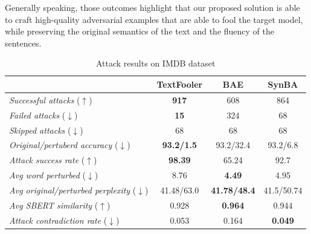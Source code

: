 Generally speaking, those outcomes highlight that our proposed solution is able to craft high-quality adversarial examples that are able to fool the target model, while preserving the original semantics of the text and the fluency of the sentences.

\begin{table}[h]
    \footnotesize
    \centering
    \begin{tabular}{|l|c|c|c|}
        \hline
        {} &           \textbf{TextFooler} &   \textbf{BAE} &    \textbf{SynBA} \\
        \hline \hline
        \emph{Successful attacks}  ($\uparrow$)             &      \textbf{917} &             608 &               864 \\
        \emph{Failed  attacks}  ($\downarrow$)                &       \textbf{15} &             324 &                68 \\
        \emph{Skipped  attacks}  ($\downarrow$)             &       68 &              68 &                68 \\
        \emph{Original/pertuberd accuracy}  ($\downarrow$)   &     \textbf{93.2/1.5} &            93.2/32.4 &              93.2/6.8 \\
        \emph{Attack success rate}  ($\uparrow$)              &    \textbf{98.39} &           65.24 &              92.7 \\
        \emph{Avg word perturbed}  ($\downarrow$)               &     8.76 &            \textbf{4.49} &              4.95 \\
        \emph{Avg original/perturbed perplexity}  ($\downarrow$)       &    41.48/63.0 &           \textbf{41.78/48.4} &              41.5/50.74 \\
        \emph{Avg SBERT similarity} ($\uparrow$)          &    0.928 &           \textbf{0.964} &             0.944 \\
        \emph{Attack contradiction rate} ($\downarrow$)      &    0.053 &           0.164 &             \textbf{0.049} \\
        \hline
        \end{tabular}
    \caption{Attack results on IMDB dataset}
    \label{tab:results-imdb}
\end{table}

